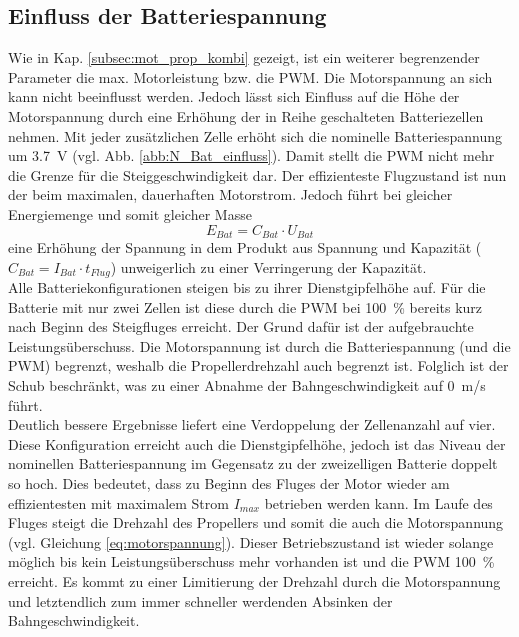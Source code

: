 \subsection{Einfluss der Batteriespannung}
\label{subsec:einfluss_n_bat}
Wie in Kap. \ref{subsec:mot_prop_kombi} gezeigt, ist ein weiterer begrenzender Parameter die max. Motorleistung bzw. die PWM. Die Motorspannung an sich kann nicht beeinflusst werden. Jedoch lässt sich Einfluss auf die Höhe der Motorspannung durch eine Erhöhung der in Reihe geschalteten Batteriezellen nehmen. Mit jeder zusätzlichen Zelle erhöht sich die nominelle Batteriespannung um \SI{3,7}{V} (vgl. Abb. \ref{abb:N_Bat_einfluss}). Damit stellt die PWM nicht mehr die Grenze für die Steiggeschwindigkeit dar. Der effizienteste Flugzustand ist nun der beim maximalen, dauerhaften Motorstrom. Jedoch führt bei gleicher Energiemenge und somit gleicher Masse 
\begin{equation}
	E_{Bat} = C_{Bat}\cdot U_{Bat}
\end{equation}
eine Erhöhung der Spannung in dem Produkt aus Spannung und Kapazität (\ensuremath{C_{Bat} = I_{Bat}\cdot t_{Flug}}) unweigerlich zu einer Verringerung der Kapazität.  \\
Alle Batteriekonfigurationen steigen bis zu ihrer Dienstgipfelhöhe auf. 
Für die Batterie mit nur zwei Zellen ist diese durch die PWM bei \SI{100}{\%} bereits kurz nach Beginn des Steigfluges erreicht. Der Grund dafür ist der aufgebrauchte Leistungsüberschuss. Die Motorspannung ist durch die Batteriespannung (und die PWM) begrenzt, weshalb die Propellerdrehzahl auch begrenzt ist. Folglich ist der Schub beschränkt, was zu einer Abnahme der Bahngeschwindigkeit auf \SI{0}{m/s} führt. \\
Deutlich bessere Ergebnisse liefert eine Verdoppelung der Zellenanzahl auf vier. Diese Konfiguration erreicht auch die Dienstgipfelhöhe, jedoch ist das Niveau der nominellen Batteriespannung im Gegensatz zu der zweizelligen Batterie doppelt so hoch. Dies bedeutet, dass zu Beginn des Fluges der Motor wieder am effizientesten mit maximalem Strom \ensuremath{I_{max}} betrieben werden kann. Im Laufe des Fluges steigt die Drehzahl des Propellers und somit die auch die Motorspannung (vgl. Gleichung \eqref{eq:motorspannung}). Dieser Betriebszustand ist wieder solange möglich bis kein Leistungsüberschuss mehr vorhanden ist und die PWM \SI{100}{\%} erreicht. Es kommt zu einer Limitierung der Drehzahl durch die Motorspannung und letztendlich zum immer schneller werdenden Absinken der Bahngeschwindigkeit. \\
